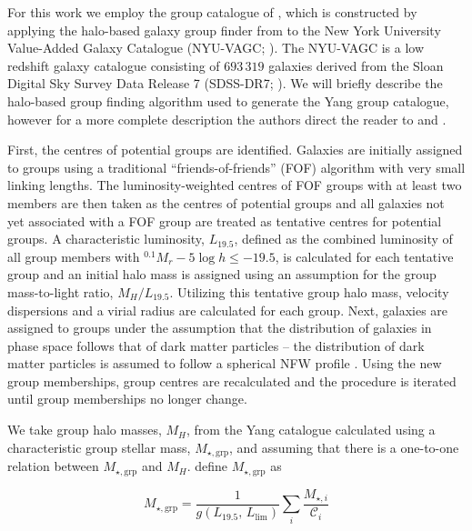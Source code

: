 \documentclass[a4paper,fleqn,usenatbib]{mnras}
\begin{document}
For this work we employ the group catalogue of \citet{yang2007}, which
is constructed by applying the halo-based galaxy group finder from
\citet{yang2005, yang2007} to the New York University Value-Added
Galaxy Catalogue (NYU-VAGC; \citealt{blanton2005}).  The NYU-VAGC is a
low redshift galaxy catalogue consisting of
$693\,319$ galaxies derived from the Sloan Digital Sky Survey Data Release
7 (SDSS-DR7; \citealt{abazajian2009}).  We will briefly describe the
halo-based group finding algorithm used to generate the Yang group catalogue,
however for a more complete description the authors direct the reader
to \citet{yang2005} and \citet{yang2007}.
\par
First, the centres of potential groups are identified.  Galaxies are
initially assigned to groups using a traditional
``friends-of-friends'' (FOF) algorithm \citep[e.g.][]{huchra1982} with
very small linking lengths.  The luminosity-weighted centres of
FOF groups with at least two members are then taken as the centres of
potential groups and all galaxies not yet associated with a FOF group
are treated as tentative centres for potential groups.  A
characteristic luminosity, $L_{19.5}$, defined as the combined
luminosity of all group members with $^{0.1}M_r - 5\log h \le -19.5$,
is calculated for each tentative group and an initial halo mass is
assigned using an assumption for the group mass-to-light ratio,
$M_H/L_{19.5}$.  Utilizing this tentative group halo mass, velocity
dispersions and a virial radius are calculated for each group.  Next,
galaxies are assigned to groups under the assumption that the
distribution of galaxies in phase space follows that of dark matter
particles -- the distribution of dark matter particles is assumed to
follow a spherical NFW profile \citep{navarro1997}.  Using the new
group memberships, group centres are recalculated and the procedure is
iterated until group memberships no longer change.
\par
We take group halo masses, $M_H$, from the Yang catalogue calculated
using a characteristic group stellar mass, $M_{\star,\text{grp}}$, and
assuming that there is a one-to-one relation between $M_{\star,\text{grp}}$
and $M_H$.  \citet{yang2007} define $M_{\star,\text{grp}}$ as

\begin{equation}
  M_{\star,\text{grp}} = \frac{1}{g(L_{19.5},\,L_{\text{lim}})} \sum_i
  \frac{M_{\star,i}}{\mathcal{C}_i}
\end{equation}
\end{document}
